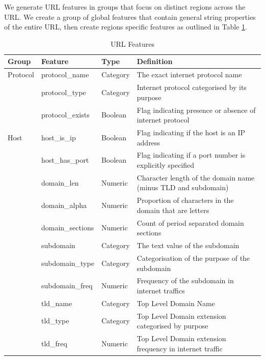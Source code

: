 \documentclass[sigconf]{acmart}
\begin{document}
We generate URL features in groups that focus on distinct regions across the URL. We create a group
of global features that contain general string properties of the entire URL, then create regions
specific features as outlined in Table \ref{tab:features}.

\begin{table}
\caption{URL Features}
\label{tab:features}
\begin{tabular}{|l|l|l|l|}
\toprule
Group         &Feature              &Type        &Definition  \\
\midrule
Protocol      &protocol\_name         &Category    &The exact internet protocol name    \\
              &protocol\_type         &Category    &Internet protocol categorised by its purpose    \\
              &protocol\_exists       &Boolean     &Flag indicating presence or absence of internet protocol   \\
\midrule
Host          &host\_is\_ip           &Boolean     &Flag indicating if the host is an IP address    \\
              &host\_has\_port        &Boolean     &Flag indicating if a port number is explicitly specified    \\
              &domain\_len            &Numeric     &Character length of the domain name (minus TLD and subdomain)     \\
              &domain\_alpha          &Numeric     &Proportion of characters in the domain that are letters    \\
              &domain\_sections       &Numeric     &Count of period separated domain sections    \\
              &subdomain              &Category    &The text value of the subdomain  \\
              &subdomain\_type        &Category    &Categorisation of the purpose of the subdomain \\
              &subdomain\_freq        &Numeric     &Frequency of the subdomain in internet traffics    \\
              &tld\_name              &Category    &Top Level Domain Name    \\
              &tld\_type              &Category    &Top Level Domain extension categorised by purpose    \\
              &tld\_freq              &Numeric     &Top Level Domain extension frequency in internet traffic   \\

\end{tabular}
\end{table}
\end{document}

